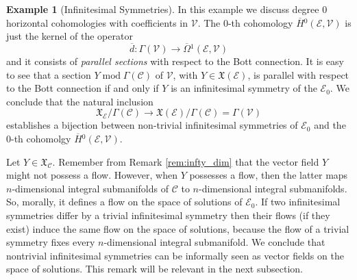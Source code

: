 \documentclass{conm-p-l}
\theoremstyle{definition}
\newtheorem{example}[theorem]{Example}
\theoremstyle{remark}
\numberwithin{equation}{section}
\begin{document}
\begin{example}[Infinitesimal Symmetries]\label{exmpl:inf_sym}
In this example we discuss degree $0$ horizontal cohomologies with coefficients in $\mathscr V$. The $0$-th cohomology $\overline H{}^0 (\mathscr E, \mathscr V)$ is just the kernel of the operator
\[
\overline d : \Gamma (\mathscr V) \to \overline \Omega{}^1 (\mathscr E, \mathscr V)
\]
and it consists of \emph{parallel sections} with respect to the Bott connection. It is easy to see that a section $Y \operatorname{mod} \Gamma (\mathscr C)$ of $\mathscr V$, with $Y \in \mathfrak X (\mathscr E)$, is parallel with respect to the Bott connection if and only if $Y$ is an infinitesimal symmetry of the $\mathscr E_0$. We conclude that the natural inclusion
\[
\mathfrak X_\mathscr{E} / \Gamma (\mathscr C) \to \mathfrak X (\mathscr E) / \Gamma (\mathscr C) = \Gamma (\mathscr V)
\]
establishes a bijection between non-trivial infinitesimal symmetries of $\mathscr E_0$ and the $0$-th cohomolgy $\overline H{}^0 (\mathscr E, \mathscr V)$. 

Let $Y \in \mathfrak X_{\mathscr C}$.  Remember from Remark \ref{rem:infty_dim} that the vector field $Y$ might not possess a flow. However,    when $Y$ possesses a flow, then the latter maps $n$-dimensional integral submanifolds of $\mathscr C$ to $n$-dimensional integral submanifolds. So, morally, it defines a flow on the space of solutions of $\mathscr E_0$. If two infinitesimal symmetries differ by a trivial infinitesimal symmetry then their flows (if they exist) induce the same flow on the space of solutions, because the flow of a trivial symmetry fixes every $n$-dimensional integral submanifold. We conclude that nontrivial infinitesimal symmetries can be informally seen as vector fields on the space of solutions. This remark will be relevant in the next subsection.
\end{example}
\end{document}
